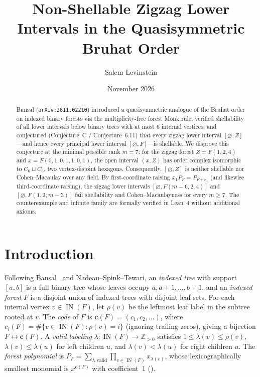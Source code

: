 \documentclass[11pt]{article}
\title{Non-Shellable Zigzag Lower Intervals in the Quasisymmetric Bruhat Order}
\author{Salem Levinstein}
\date{November 2026}
\theoremstyle{remark}
\DeclareMathOperator{\IN}{IN}
\begin{document}
\maketitle

\begin{abstract}
Bansal (\texttt{arXiv:2611.02210}) introduced a quasisymmetric analogue of the Bruhat order on indexed binary forests via the multiplicity-free forest Monk rule, verified shellability of all lower intervals below binary trees with at most $6$ internal vertices, and conjectured (Conjecture~C / Conjecture~6.11) that every zigzag lower interval $[\varnothing, Z]$---and hence every principal lower interval $[\varnothing, F]$---is shellable. We disprove this conjecture at the minimal possible rank $m = 7$: for the zigzag forest $Z = F(1, 2, 4)$ and $x = F(0, 1, 0, 1, 1, 0, 1)$, the open interval $(x, Z)$ has order complex isomorphic to $C_6 \sqcup C_6$, two vertex-disjoint hexagons. Consequently, $[\varnothing, Z]$ is neither shellable nor Cohen--Macaulay over any field. By first-coordinate raising $x_1 P_F = P_{F + e_1}$ (and likewise third-coordinate raising), the zigzag lower intervals $[\varnothing, F(m - 6, 2, 4)]$ and $[\varnothing, F(1, 2, m - 3)]$ fail shellability and Cohen--Macaulayness for every $m \ge 7$. The counterexample and infinite family are formally verified in Lean~4 without additional axioms.
\end{abstract}

\section{Introduction}

Following Bansal~\cite[Section~2]{Bansal2026} and Nadeau--Spink--Tewari, an \emph{indexed tree} with support $[a, b]$ is a full binary tree whose leaves occupy $a, a + 1, \dots, b + 1$, and an \emph{indexed forest} $F$ is a disjoint union of indexed trees with disjoint leaf sets. For each internal vertex $v \in \IN(F)$, let $\rho(v)$ be the leftmost leaf label in the subtree rooted at $v$. The \emph{code} of $F$ is $\mathbf{c}(F) = (c_1, c_2, \dots)$, where $c_i(F) = \#\{v \in \IN(F) : \rho(v) = i\}$ (ignoring trailing zeros), giving a bijection $F \leftrightarrow \mathbf{c}(F)$. A \emph{valid labeling} $\lambda : \IN(F) \to \mathbb{Z}_{>0}$ satisfies $1 \le \lambda(v) \le \rho(v)$, $\lambda(v) \le \lambda(u)$ for left children $u$, and $\lambda(v) < \lambda(u)$ for right children $u$. The \emph{forest polynomial} is $P_F = \sum_{\lambda\text{ valid}} \prod_{v \in \IN(F)} x_{\lambda(v)}$, whose lexicographically smallest monomial is $x^{\mathbf{c}(F)}$ with coefficient~$1$ (\cite[Fact~2.5]{Bansal2026}).
\end{document}
